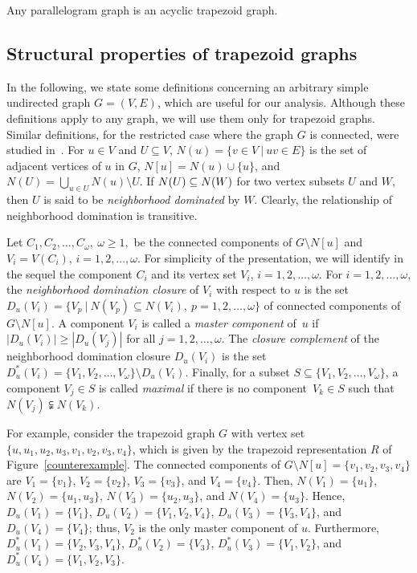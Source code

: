 \documentclass[proceedings]{stacs}
\begin{document}
\begin{lemma}
\label{par}Any parallelogram graph is an acyclic trapezoid graph.
\end{lemma}


\subsection{Structural properties of trapezoid graphs}

\label{sec:structure}

In the following, we state some definitions concerning an arbitrary simple
undirected graph ${G=(V,E)}$, which are useful for our analysis. Although
these definitions apply to any graph, we will use them only for trapezoid
graphs. Similar definitions, for the restricted case where the graph $G$ is
connected, were studied in~\cite{Cheah96}. For $u\in V$ and $U\subseteq V$, $%
N(u)=\{v\in V\ |\ uv\in E\}$ is the set of adjacent vertices of $u$ in $G$, $%
{N[u]=N(u)\cup \{u\}}$, and ${N(U)=\bigcup_{u\in U}N(u)\setminus U}$. If ${%
N(U)\subseteq N(W)}$ for two vertex subsets $U$ and $W$, then $U$ is said to
be \emph{neighborhood dominated} by $W$. Clearly, the relationship of
neighborhood domination is transitive. 

Let ${C_{1},C_{2},\ldots ,C_{\omega },\ \omega \geq 1,}$ be the connected
components of ${G\setminus N[u]}$ and ${V_{i}=V(C_{i})}$, ${i=1,2,\ldots
,\omega }$. For simplicity of the presentation, we will identify in the
sequel the component $C_{i}$ and its vertex set $V_{i}$, ${i=1,2,\ldots
,\omega }$. For ${i=1,2,\ldots ,\omega }$, the \emph{neighborhood domination
closure} of $V_{i}$ with respect to $u$ is the set ${D_{u}(V_{i})=\{V_{p}\
|\ N(V_{p})\subseteq N(V_{i}),\ p=1,2,\ldots ,\omega \}}$ of connected
components of ${G\setminus N[u]}$. A component $V_{i}$ is called 
a \emph{master component} of~$u$ if ${|D_{u}(V_{i})|\geq |D_{u}(V_{j})|}$ for 
all ${j=1,2,\ldots ,\omega }$. The \emph{closure complement} of the neighborhood
domination closure ${D_{u}(V_{i})}$ is the set ${D_{u}^{\ast
}(V_{i})=\{V_{1},V_{2},\ldots ,V_{\omega }\}\setminus D_{u}(V_{i})}$.
Finally, for a subset ${S\subseteq \{V_{1},V_{2},\ldots ,V_{\omega }\}}$, a
component $V_{j} \in S$ is called \emph{maximal} if there is no component~$V_{k}\in S$ 
such that ${N(V_{j})\subsetneqq N(V_{k})}$.

For example, consider the trapezoid graph $G$ with vertex set 
$\{u,u_{1},u_{2},u_{3},v_{1},v_{2},v_{3},v_{4}\}$, which is given by the
trapezoid representation $R$ of Figure~\ref{counterexample}. The connected
components of ${G\setminus N[u]=\{v_{1},v_{2},v_{3},v_{4}\}}$ are 
${V_{1}=\{v_{1}\}}$, ${V_{2}=\{v_{2}\}}$, ${V_{3}=\{v_{3}\}}$, and ${V_{4}=\{v_{4}\}}$. 
Then, ${N(V_{1})=\{u_{1}\}}$, ${N(V_{2})=\{u_{1},u_{3}\}}$, 
${N(V_{3})=\{u_{2},u_{3}\}}$, and ${N(V_{4})=\{u_{3}\}}$. Hence, 
${D_{u}(V_{1})=\{V_{1}\}}$, ${D_{u}(V_{2})=\{V_{1},V_{2},V_{4}\}}$, 
${D_{u}(V_{3})=\{V_{3},V_{4}\}}$, and ${D_{u}(V_{4})=\{V_{4}\}}$; thus, $V_{2}$
is the only master component of $u$. 
Furthermore, ${D_{u}^{\ast}(V_{1})=\{V_{2},V_{3},V_{4}\}}$, 
${D_{u}^{\ast }(V_{2})=\{V_{3}\}}$, ${D_{u}^{\ast}(V_{3})=\{V_{1},V_{2}\}}$, 
and ${D_{u}^{\ast}(V_{4})=\{V_{1},V_{2},V_{3}\}}$.
\end{document}
